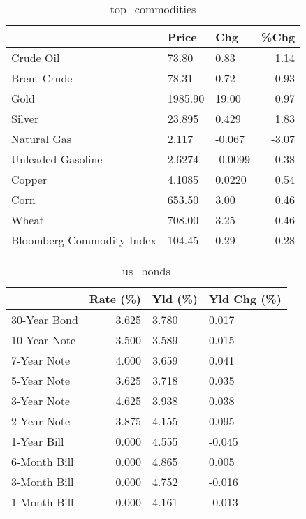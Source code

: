 \documentclass{article}%
\begin{document}
\begin{table}[htbp]%
\caption{top\_commodities}%
\centering%
\begin{adjustbox}{width=1\textwidth}%
\begin{tabular}{lllr}
\toprule
                          &   Price &     Chg &  \%Chg \\
\midrule
               Crude Oil  &   73.80 &    0.83 &  1.14 \\
             Brent Crude  &   78.31 &    0.72 &  0.93 \\
                    Gold  & 1985.90 &   19.00 &  0.97 \\
                  Silver  &  23.895 &   0.429 &  1.83 \\
             Natural Gas  &   2.117 &  -0.067 & -3.07 \\
       Unleaded Gasoline  &  2.6274 & -0.0099 & -0.38 \\
                  Copper  &  4.1085 &  0.0220 &  0.54 \\
                    Corn  &  653.50 &    3.00 &  0.46 \\
                   Wheat  &  708.00 &    3.25 &  0.46 \\
Bloomberg Commodity Index &  104.45 &    0.29 &  0.28 \\
\bottomrule
\end{tabular}
%
\end{adjustbox}%
\end{table}

%


\begin{table}[htbp]%
\caption{us\_bonds}%
\centering%
\begin{adjustbox}{width=1\textwidth}%
\begin{tabular}{lrll}
\toprule
             &  Rate (\%) & Yld (\%) & Yld Chg (\%) \\
\midrule
30-Year Bond &     3.625 &   3.780 &       0.017 \\
10-Year Note &     3.500 &   3.589 &       0.015 \\
 7-Year Note &     4.000 &   3.659 &       0.041 \\
 5-Year Note &     3.625 &   3.718 &       0.035 \\
 3-Year Note &     4.625 &   3.938 &       0.038 \\
 2-Year Note &     3.875 &   4.155 &       0.095 \\
 1-Year Bill &     0.000 &   4.555 &      -0.045 \\
6-Month Bill &     0.000 &   4.865 &       0.005 \\
3-Month Bill &     0.000 &   4.752 &      -0.016 \\
1-Month Bill &     0.000 &   4.161 &      -0.013 \\
\bottomrule
\end{tabular}
%
\end{adjustbox}%
\end{table}
\end{document}
